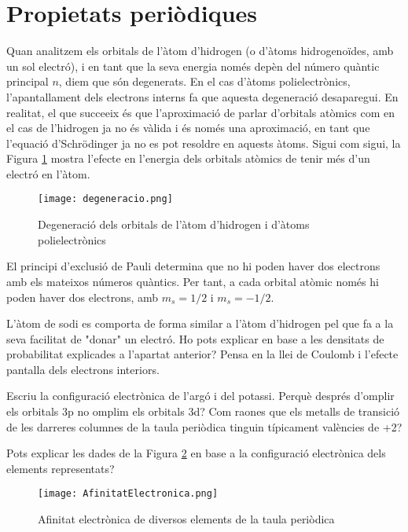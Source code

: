 


\section{Propietats periòdiques}

Quan analitzem els orbitals de l'àtom d'hidrogen (o d'àtoms hidrogenoïdes, amb un sol electró), i en tant que la seva energia només depèn del número quàntic principal $n$, diem que són degenerats. En el cas d'àtoms polielectrònics, l'apantallament dels electrons interns fa que aquesta degeneració desaparegui. En realitat, el que succeeix és que l'aproximació de parlar d'orbitals atòmics com en el cas de l'hidrogen ja no és vàlida i és només una aproximació, en tant que l'equació d'Schrödinger ja no es pot resoldre en aquests àtoms.
Sigui com sigui, la Figura \ref{fig:degeneracio} mostra l'efecte en l'energia dels orbitals atòmics de tenir més d'un electró en l'àtom.
\begin{figure}[h]
\centering
\texttt{[image: degeneracio.png]}
\caption{Degeneració dels orbitals de l'àtom d'hidrogen i d'àtoms polielectrònics}
\label{fig:degeneracio}
\end{figure}

El principi d'exclusió de Pauli determina que no hi poden haver dos electrons amb els mateixos números quàntics. Per tant, a cada orbital atòmic només hi poden haver dos electrons, amb $m_s=1/2$ i $m_s=-1/2$.
\begin{exr}
L'àtom de sodi es comporta de forma similar a l'àtom d'hidrogen pel que fa a la seva facilitat de "donar" un electró. Ho pots explicar en base a les densitats de probabilitat explicades a l'apartat anterior? Pensa en la llei de Coulomb i l'efecte pantalla dels electrons interiors.
\end{exr}
\begin{exr}
Escriu la configuració electrònica de l'argó i del potassi. Perquè després d'omplir els orbitals 3p no omplim els orbitals 3d? Com raones que els metalls de transició de les  darreres columnes de la taula periòdica tinguin típicament valències de +2?
\end{exr}
\begin{exr}
Pots explicar les dades de la Figura \ref{fig:AfinitatElectronica} en base a la configuració electrònica dels elements representats?
\end{exr}
\begin{figure}[h]
\centering
\texttt{[image: AfinitatElectronica.png]}
\caption{Afinitat electrònica de diversos elements de la taula periòdica}
\label{fig:AfinitatElectronica}
\end{figure}
